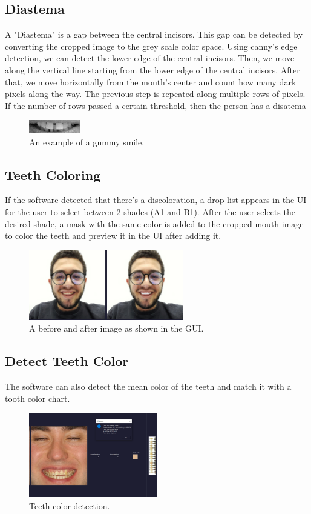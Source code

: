 \documentclass[conference,twocolumn]{IEEEtran}
\begin{document}
\subsection{Diastema}
A "Diastema" is a gap between the central incisors. 
This gap can be detected by converting the cropped image to the grey scale color space. Using canny's edge detection, we can detect the lower edge of the central incisors. 
Then, we move along the vertical line starting from
the lower edge of the central incisors. After that, we move horizontally from the
mouth’s center and count how many dark pixels along the way.
The previous step is repeated along multiple rows of pixels. If
the number of rows passed a certain threshold, then the person
has a disatema
\begin{figure}[H]
    \centering
    \includegraphics[width=0.2\textwidth]{diastemapng.png}
    \caption{An example of a gummy smile.}
    \label{fig:my_label}
\end{figure}
\subsection{Teeth Coloring}
If the software detected that there's a discoloration, a drop list appears in the UI for the user to select between 2 shades (A1 and B1).
After the user selects the desired shade, a mask with the same color is added to the cropped mouth image to color the teeth and preview it in the UI after adding it. 
\begin{figure}[H]
    \centering
    \includegraphics[width=0.6\textwidth]{coloring.png}
    \caption{A before and after image as shown in the GUI.}
    \label{fig:my_label}
\end{figure}
\subsection{Detect Teeth Color}
The software can also detect the mean color of the teeth and match it with a tooth color chart.
\begin{figure}[H]
    \centering
    \includegraphics[width=0.5\textwidth]{sahde.png}
    \caption{Teeth color detection.}
    \label{fig:my_label}
\end{figure}
\end{document}
